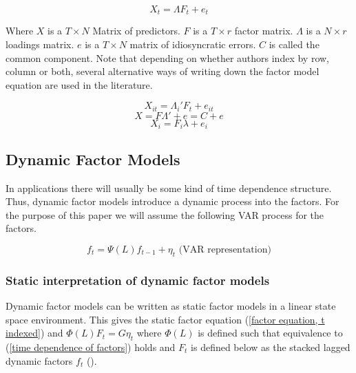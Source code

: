\documentclass[11pt]{article}
\begin{document}
\begin{equation}
	\label{factor equation, t indexed}
	X_t = \Lambda F_t + e_t
\end{equation}

Where $X$ is a $T \times N$ Matrix of predictors. $F$ is a $T \times r$ factor matrix. $\Lambda$ is a $N \times r$ loadings matrix. $e$ is a $T \times N$ matrix of idiosyncratic errors. $C$ is called the common component.
Note that depending on whether authors index by row, column or both, several alternative ways of writing down the factor model equation are used in the literature.

\begin{equation}
	\label{factor equation, it indexed}
	X_{it} = \Lambda_i' F_t + e_{it}
\end{equation}
\begin{equation}
	\label{static factor equation}
	X = F \Lambda' + e = C + e
\end{equation}
\begin{equation}
	\label{factor equation, i indexed}
	X_i = F_i \lambda + e_i
\end{equation}





\subsection{Dynamic Factor Models}
In applications there will usually be some kind of time dependence structure. Thus, dynamic factor models introduce a dynamic process into the factors. For the purpose of this paper we will assume the following VAR process for the factors.

\begin{equation}
	\label{time dependence of factors}
	f_t = \Psi(L) f_{t-1} + \eta_t \text{\ \ \ \ \ (VAR representation)}
\end{equation}



\subsubsection{Static interpretation of dynamic factor models}
Dynamic factor models can be written as static factor models in a linear state space environment. This gives the static factor equation (\ref{factor equation, t indexed}) and $\Phi(L) F_t = G \eta_t$ where $\Phi(L)$ is defined such that equivalence to (\ref{time dependence of factors}) holds and $F_t$ is defined below as the stacked lagged dynamic factors $f_t$ (\citet{stock2011dynamic}). \\
\end{document}
